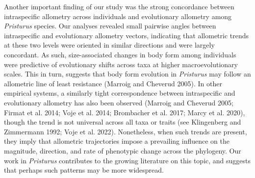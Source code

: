 \documentclass[
  11pt,
]{article}
\begin{document}
Another important finding of our study was the strong concordance
between intraspecific allometry across individuals and evolutionary
allometry among \emph{Pristurus} species. Our analyses revealed small
pairwise angles between intraspecific and evolutionary allometry
vectors, indicating that allometric trends at these two levels were
oriented in similar directions and were largely concordant. As such,
size-associated changes in body form among individuals were predictive
of evolutionary shifts across taxa at higher macroevolutionary scales.
This in turn, suggests that body form evolution in \emph{Pristurus} may
follow an allometric line of least resistance (Marroig and Cheverud
2005). In other empirical systems, a similarly tight correspondence
between intraspecific and evolutionary allometry has also been observed
(Marroig and Cheverud 2005; Firmat et al. 2014; Voje et al. 2014;
Brombacher et al. 2017; Marcy et al. 2020), though the trend is not
universal across all taxa or traits (see Klingenberg and Zimmermann
1992; Voje et al. 2022). Nonetheless, when such trends are present, they
imply that allometric trajectories impose a prevailing influence on the
magnitude, direction, and rate of phenotypic change across the
phylogeny. Our work in \emph{Pristurus} contributes to the growing
literature on this topic, and suggests that perhaps such patterns may be
more widespread.\hfill\break
\end{document}
